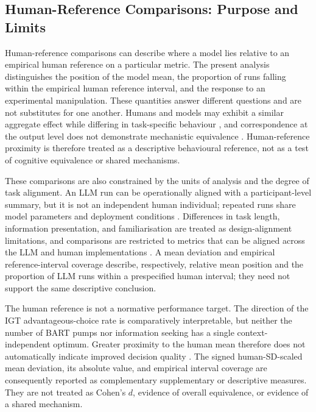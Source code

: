 \subsection{Human-Reference Comparisons: Purpose and Limits}

Human-reference comparisons can describe where a model lies relative to an empirical human reference on a particular metric. The present analysis distinguishes the position of the model mean, the proportion of runs falling within the empirical human reference interval, and the response to an experimental manipulation. These quantities answer different questions and are not substitutes for one another. Humans and models may exhibit a similar aggregate effect while differing in task-specific behaviour \cite{Lampinen2024ContentEffects}, and correspondence at the output level does not demonstrate mechanistic equivalence \cite{Lin2025SixFallacies}. Human-reference proximity is therefore treated as a descriptive behavioural reference, not as a test of cognitive equivalence or shared mechanisms.

These comparisons are also constrained by the units of analysis and the degree of task alignment. An LLM run can be operationally aligned with a participant-level summary, but it is not an independent human individual; repeated runs share model parameters and deployment conditions \cite{Dillion2023ReplaceParticipants,Bisbee2024SyntheticSurveyData}. Differences in task length, information presentation, and familiarisation are treated as design-alignment limitations, and comparisons are restricted to metrics that can be aligned across the LLM and human implementations \cite{Wilson2014,Buelow2009IGTValidity,Wallsten2005BARTModel}. A mean deviation and empirical reference-interval coverage describe, respectively, relative mean position and the proportion of LLM runs within a prespecified human interval; they need not support the same descriptive conclusion.

The human reference is not a normative performance target. The direction of the IGT advantageous-choice rate is comparatively interpretable, but neither the number of BART pumps nor information seeking has a single context-independent optimum. Greater proximity to the human mean therefore does not automatically indicate improved decision quality \cite{Wilson2014,Buelow2009IGTValidity,Wallsten2005BARTModel}. The signed human-SD-scaled mean deviation, its absolute value, and empirical interval coverage are consequently reported as complementary supplementary or descriptive measures. They are not treated as Cohen's \(d\), evidence of overall equivalence, or evidence of a shared mechanism.

